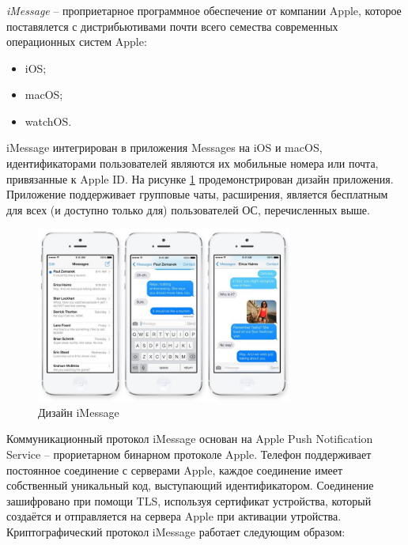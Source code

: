 \subsubsection{}
\label{sec:analysis:research:analogs:imessage}

\textit{iMessage} -- проприетарное программное обеспечение от компании Apple, которое поставялется с дистрибьютивами почти всего семества современных операционных систем Apple:
\begin{itemize}
	\item iOS;
	\item macOS;
	\item watchOS.
\end{itemize}

iMessage интегрирован в приложения Messages на iOS и macOS, идентификаторами пользователей являются их мобильные номера или почта, привязанные к Apple ID. На рисунке \ref{sec:analysis:research:analogs:imessage:design} продемонстрирован дизайн приложения. Приложение поддерживает групповые чаты, расширения, является бесплатным для всех (и доступно только для) пользователей ОС, перечисленных выше.

\begin{figure}[h]
  \centering
    \includegraphics[width=0.75\textwidth]{inc/img/imdesign.jpeg}
  \caption{Дизайн iMessage}
  \label{sec:analysis:research:analogs:imessage:design}
\end{figure}

Коммуникационный протокол iMessage основан на Apple Push Notification Service -- прориетарном бинарном протоколе Apple. Телефон поддерживает постоянное соединение с серверами Apple, каждое соединение имеет собственный уникальный код, выступающий идентификатором. Соединение зашифровано при помощи TLS, используя сертификат устройства, который создаётся и отправляется на сервера Apple при активации утройства.
Криптографический протокол iMessage работает следующим образом:

